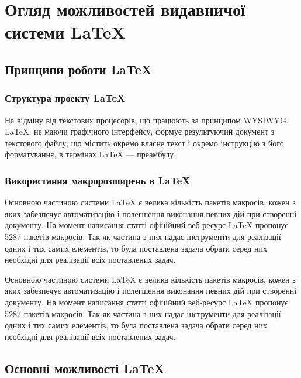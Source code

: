 \chapter{Огляд можливостей видавничої системи \LaTeX{} } 
\label{chapter:first}

\section{Принципи роботи \LaTeX{}}

\subsection{Структура проекту \LaTeX{}}

На   відміну   від   текстових   процесорів,   що   працюють   за   принципом WYSIWYG,  LaTeX,  не  маючи  графічного  інтерфейсу,  формує  результуючий документ з текстового файлу, що містить окремо власне текст і окремо інструкцію з його форматування, в термінах 
LaTeX --- преамбулу.

\subsection{Використання макророзширень в \LaTeX{}}

Основною  частиною  системи  LaTeX  є  велика  кількість  пакетів  макросів, кожен  з  яких  забезпечує  автоматизацію  і  полегшення  виконання  певних  дій  при створенні  документу.  На  момент  написання  статті  офіційний  веб-ресурс  LaTeX пропонує  5287  пакетів  макросів.  Так як  частина  з  них  надає  інструменти  для реалізації  одних  і  тих  самих  елементів,  то  була  поставлена  задача  обрати  серед них  необхідні  для  реалізації  всіх  поставлених  задач. 

Основною  частиною  системи  LaTeX  є  велика  кількість  пакетів  макросів, кожен  з  яких  забезпечує  автоматизацію  і  полегшення  виконання  певних  дій  при створенні  документу.  На  момент  написання  статті  офіційний  веб-ресурс  LaTeX пропонує  5287  пакетів  макросів.  Так як  частина  з  них  надає  інструменти  для реалізації  одних  і  тих  самих  елементів,  то  була  поставлена  задача  обрати  серед них  необхідні  для  реалізації  всіх  поставлених  задач. 

\section{Основні можливості \LaTeX{}}

